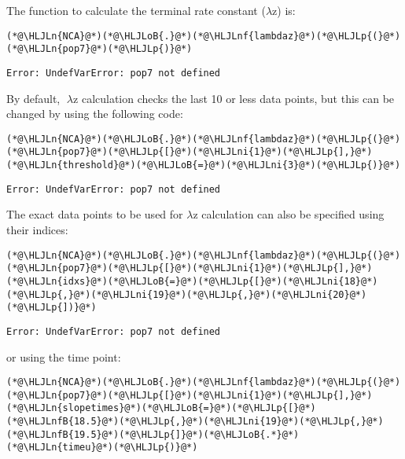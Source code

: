\documentclass[12pt,a4paper]{article}
\newcommand{\HLJLn}[1]{#1}
\newcommand{\HLJLnf}[1]{\textcolor[RGB]{66,102,213}{#1}}
\newcommand{\HLJLnfB}[1]{\textcolor[RGB]{59,151,46}{#1}}
\newcommand{\HLJLni}[1]{\textcolor[RGB]{59,151,46}{#1}}
\newcommand{\HLJLoB}[1]{\textcolor[RGB]{102,102,102}{\textbf{#1}}}
\newcommand{\HLJLp}[1]{#1}
\begin{document}
The function to calculate the terminal rate constant (\ensuremath{\lambda}z) is:


\begin{lstlisting}
(*@\HLJLn{NCA}@*)(*@\HLJLoB{.}@*)(*@\HLJLnf{lambdaz}@*)(*@\HLJLp{(}@*)(*@\HLJLn{pop7}@*)(*@\HLJLp{)}@*)
\end{lstlisting}

\begin{lstlisting}
Error: UndefVarError: pop7 not defined
\end{lstlisting}


By default, \ensuremath{\lambda}z calculation checks the last 10 or less data points, but this can be changed by using the following code:


\begin{lstlisting}
(*@\HLJLn{NCA}@*)(*@\HLJLoB{.}@*)(*@\HLJLnf{lambdaz}@*)(*@\HLJLp{(}@*)(*@\HLJLn{pop7}@*)(*@\HLJLp{[}@*)(*@\HLJLni{1}@*)(*@\HLJLp{],}@*) (*@\HLJLn{threshold}@*)(*@\HLJLoB{=}@*)(*@\HLJLni{3}@*)(*@\HLJLp{)}@*)
\end{lstlisting}

\begin{lstlisting}
Error: UndefVarError: pop7 not defined
\end{lstlisting}


The exact data points to be used for \ensuremath{\lambda}z calculation can also be specified using their indices:


\begin{lstlisting}
(*@\HLJLn{NCA}@*)(*@\HLJLoB{.}@*)(*@\HLJLnf{lambdaz}@*)(*@\HLJLp{(}@*)(*@\HLJLn{pop7}@*)(*@\HLJLp{[}@*)(*@\HLJLni{1}@*)(*@\HLJLp{],}@*) (*@\HLJLn{idxs}@*)(*@\HLJLoB{=}@*)(*@\HLJLp{[}@*)(*@\HLJLni{18}@*)(*@\HLJLp{,}@*)(*@\HLJLni{19}@*)(*@\HLJLp{,}@*)(*@\HLJLni{20}@*)(*@\HLJLp{])}@*)
\end{lstlisting}

\begin{lstlisting}
Error: UndefVarError: pop7 not defined
\end{lstlisting}


or using the time point:


\begin{lstlisting}
(*@\HLJLn{NCA}@*)(*@\HLJLoB{.}@*)(*@\HLJLnf{lambdaz}@*)(*@\HLJLp{(}@*)(*@\HLJLn{pop7}@*)(*@\HLJLp{[}@*)(*@\HLJLni{1}@*)(*@\HLJLp{],}@*) (*@\HLJLn{slopetimes}@*)(*@\HLJLoB{=}@*)(*@\HLJLp{[}@*)(*@\HLJLnfB{18.5}@*)(*@\HLJLp{,}@*)(*@\HLJLni{19}@*)(*@\HLJLp{,}@*)(*@\HLJLnfB{19.5}@*)(*@\HLJLp{]}@*)(*@\HLJLoB{.*}@*)(*@\HLJLn{timeu}@*)(*@\HLJLp{)}@*)
\end{lstlisting}
\end{document}
